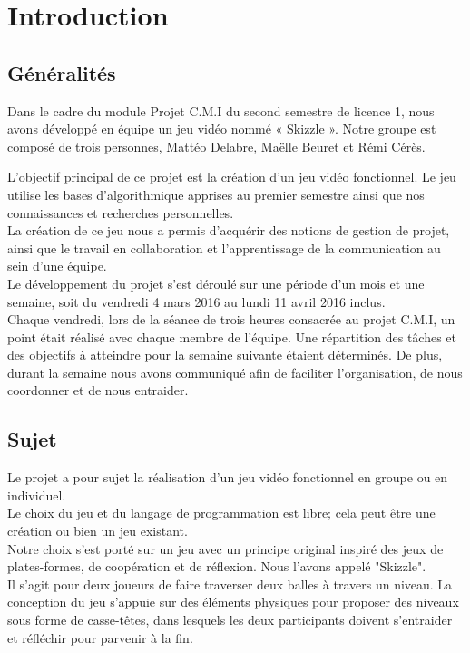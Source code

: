 \chapter{Introduction}

\section {Généralités}

Dans le cadre du module Projet C.M.I du second semestre de licence 1,
nous avons développé en équipe un jeu vidéo nommé « Skizzle ».
Notre groupe est composé de trois personnes, Mattéo Delabre, Maëlle Beuret
et Rémi Cérès.

L'objectif principal de ce projet est la création d'un jeu vidéo fonctionnel. Le jeu utilise les bases d'algorithmique apprises au premier semestre ainsi que nos connaissances et
recherches personnelles.\\
La création de ce jeu nous a permis d'acquérir des notions de gestion de projet, ainsi que le travail en collaboration et l'apprentissage de la
communication au sein d'une équipe.
\\

Le développement du projet s'est déroulé sur une période d'un mois et une semaine,
soit du vendredi 4 mars 2016 au lundi 11 avril 2016 inclus.\\
Chaque vendredi,
lors de la séance de trois heures consacrée au projet C.M.I, un point était réalisé avec chaque membre de l'équipe.
Une répartition des tâches et des objectifs
à atteindre pour la semaine suivante étaient déterminés. De plus, durant la semaine nous avons communiqué afin de faciliter l'organisation, de nous coordonner et de nous entraider.\\


\section {Sujet}
Le projet a pour sujet la réalisation d'un jeu vidéo
fonctionnel en groupe ou en individuel.\\
Le choix du jeu et du langage de programmation est libre; cela peut être une création ou bien un jeu existant.\\

Notre choix s'est porté sur un jeu avec un principe original inspiré des jeux de
plates-formes, de coopération et de réflexion. Nous l'avons appelé "Skizzle".\\

Il s’agit pour deux joueurs de faire traverser deux
balles à travers un niveau.
La conception du jeu s’appuie sur des éléments physiques pour proposer des
niveaux sous forme de casse-têtes, dans lesquels les deux participants doivent
s’entraider et réfléchir pour parvenir à la fin.

